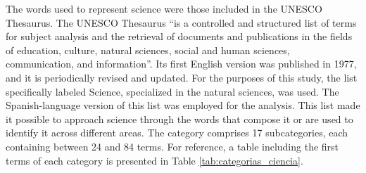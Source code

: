\documentclass[11pt,a4paper]{article}
\begin{document}
The words used to represent science were those included in the UNESCO Thesaurus. The UNESCO Thesaurus ``is a controlled and structured list of terms for subject analysis and the retrieval of documents and publications in the fields of education, culture, natural sciences, social and human sciences, communication, and information''\cite{unesco_thesaurus_1977}. Its first English version was published in 1977, and it is periodically revised and updated. For the purposes of this study, the list specifically labeled Science, specialized in the natural sciences, was used. The Spanish-language version of this list was employed for the analysis. This list made it possible to approach science through the words that compose it or are used to identify it across different areas. The category comprises 17 subcategories, each containing between 24 and 84 terms. For reference, a table including the first terms of each category is presented in Table \ref{tab:categorias_ciencia}.
\end{document}
